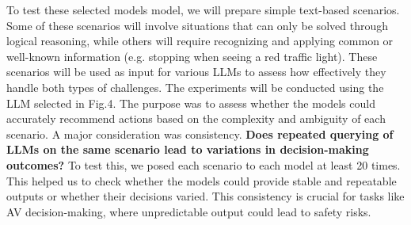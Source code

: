 \documentclass[conference]{IEEEtran}
\begin{document}
To test these selected models model, we will prepare simple text-based scenarios. Some of these scenarios will involve situations that can only be solved through logical reasoning, while others will require recognizing and applying common or well-known information (e.g. stopping when seeing a red traffic light). These scenarios will be used as input for various LLMs to assess how effectively they handle both types of challenges. The experiments will be conducted using the LLM selected in Fig.4. The purpose was to assess whether the models could accurately recommend actions based on the complexity and ambiguity of each scenario.  A major consideration was consistency. \textbf{Does repeated querying of LLMs on the same scenario lead to variations in decision-making outcomes?} To test this, we posed each scenario to each model at least 20 times. This helped us to check whether the models could provide stable and repeatable outputs or whether their decisions varied. This consistency is crucial for tasks like AV decision-making, where unpredictable output could lead to safety risks.




\end{document}
